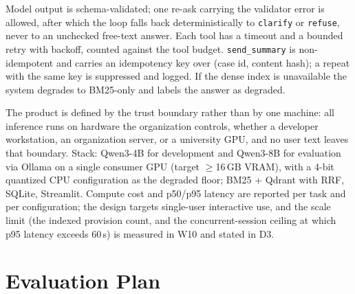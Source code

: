 Model output is schema-validated; one re-ask carrying the validator error is allowed, after which the loop falls back deterministically to \texttt{clarify} or \texttt{refuse}, never to an unchecked free-text answer. Each tool has a timeout and a bounded retry with backoff, counted against the tool budget. \texttt{send\_summary} is non-idempotent and carries an idempotency key over (case id, content hash); a repeat with the same key is suppressed and logged. If the dense index is unavailable the system degrades to BM25-only and labels the answer as degraded.

\enlargethispage{2\baselineskip}
The product is defined by the trust boundary rather than by one machine: all inference runs on hardware the organization controls, whether a developer workstation, an organization server, or a university GPU, and no user text leaves that boundary. Stack: Qwen3-4B for development and Qwen3-8B for evaluation via Ollama on a single consumer GPU (target $\geq$16\,GB VRAM), with a 4-bit quantized CPU configuration as the degraded floor; BM25 + Qdrant with RRF, SQLite, Streamlit. Compute cost and p50/p95 latency are reported per task and per configuration; the design targets single-user interactive use, and the scale limit (the indexed provision count, and the concurrent-session ceiling at which p95 latency exceeds 60\,s) is measured in W10 and stated in D3.

\section{Evaluation Plan}

